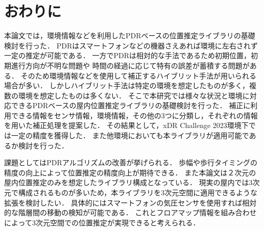 

\section{おわりに}
本論文では，環境情報などを利用したPDRベースの位置推定ライブラリの基礎検討を行った．
PDRはスマートフォンなどの機器さえあれば環境に左右されず一定の推定が可能である．
一方でPDRは相対的な手法であるため初期位置，初期進行方向が不明な問題や
時間の経過に応じて特有の誤差が蓄積する問題がある．
そのため環境情報などを使用して補正するハイブリット手法が用いられる場合が多い．
しかしハイブリット手法は特定の環境を想定したものが多く，複数の環境を想定したものは多くない．
そこで本研究では様々な状況と環境に対応できるPDRベースの屋内位置推定ライブラリの基礎検討を行った．
補正に利用できる情報をセンサ情報，環境情報，その他の3つに分類し，それぞれの情報を用いた補正処理を提案した．
その結果として，xDR Challenge 2023環境下では一定の精度を獲得した．
また他環境においても本ライブラリが適用可能であるか検討を行った．

課題としてはPDRアルゴリズムの改善が挙げられる．
歩幅や歩行タイミングの精度の向上によって位置推定の精度向上が期待できる．
また本論文は２次元の屋内位置推定のみを想定したライブラリ構成となっている．
現実の屋内では3次元で構成されるものが多いため，本ライブラリを3次元空間に適用できるような拡張を検討したい．
具体的にはスマートフォンの気圧センサを使用すれば相対的な階層間の移動の検知が可能である．
これとフロアマップ情報を組み合わせによって3次元空間での位置推定が実現できると考えられる．


